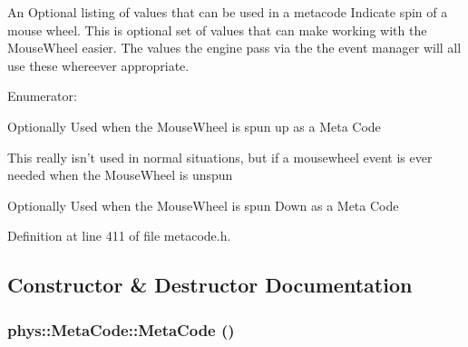 An Optional listing of values that can be used in a metacode Indicate spin of a mouse wheel. This is optional set of values that can make working with the MouseWheel easier. The values the engine pass via the the event manager will all use these whereever appropriate. \begin{Desc}
\item[Enumerator: ]\par
\begin{description}
\item[{\em 
\hypertarget{classphys_1_1MetaCode_af9ba277d1ef071be8861e35c2b7d82d6a15542262fc8fe9a3d6746f2b84ecde11}{
MOUSEWHEEL\_\-UP}
\label{da/dc9/classphys_1_1MetaCode_af9ba277d1ef071be8861e35c2b7d82d6a15542262fc8fe9a3d6746f2b84ecde11}
}]Optionally Used when the MouseWheel is spun up as a Meta Code \item[{\em 
\hypertarget{classphys_1_1MetaCode_af9ba277d1ef071be8861e35c2b7d82d6aa3d86fe74d1c191d7c57f886c0b8d99a}{
MOUSEWHEEL\_\-UNCHANGED}
\label{da/dc9/classphys_1_1MetaCode_af9ba277d1ef071be8861e35c2b7d82d6aa3d86fe74d1c191d7c57f886c0b8d99a}
}]This really isn't used in normal situations, but if a mousewheel event is ever needed when the MouseWheel is unspun \item[{\em 
\hypertarget{classphys_1_1MetaCode_af9ba277d1ef071be8861e35c2b7d82d6ab6edd0886d2ec2d2917bbad96ce3d510}{
MOUSEWHEEL\_\-DOWN}
\label{da/dc9/classphys_1_1MetaCode_af9ba277d1ef071be8861e35c2b7d82d6ab6edd0886d2ec2d2917bbad96ce3d510}
}]Optionally Used when the MouseWheel is spun Down as a Meta Code \end{description}
\end{Desc}



Definition at line 411 of file metacode.h.

\subsection{Constructor \& Destructor Documentation}
\hypertarget{classphys_1_1MetaCode_ae2c80c84f924ddfd880f46ffe6a1746e}{
\subsubsection[{MetaCode}]{\setlength{\rightskip}{0pt plus 5cm}phys::MetaCode::MetaCode ()}}
\label{da/dc9/classphys_1_1MetaCode_ae2c80c84f924ddfd880f46ffe6a1746e}



